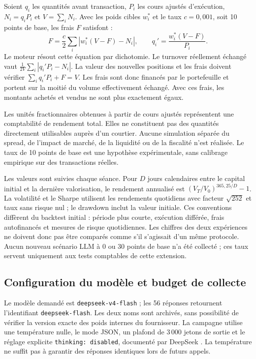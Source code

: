 Soient $q_i$ les quantités avant transaction, $P_i$ les cours ajustés d'exécution, $N_i=q_iP_i$ et $V=\sum_i N_i$. Avec les poids cibles $w_i^*$ et le taux $c=0{,}001$, soit 10 points de base, les frais $F$ satisfont :
\begin{equation}
F=\frac{c}{2}\sum_i\left|w_i^*(V-F)-N_i\right|,
\qquad q_i'=\frac{w_i^*(V-F)}{P_i}.
\label{eq:frais-allocation}
\end{equation}
Le moteur résout cette équation par dichotomie. Le turnover réellement échangé vaut $\frac{1}{2V}\sum_i|q_i'P_i-N_i|$. La valeur des nouvelles positions et les frais doivent vérifier $\sum_i q_i'P_i+F=V$. Les frais sont donc financés par le portefeuille et portent sur la moitié du volume effectivement échangé. Avec ces frais, les montants achetés et vendus ne sont plus exactement égaux.

Les unités fractionnaires obtenues à partir de cours ajustés représentent une comptabilité de rendement total. Elles ne constituent pas des quantités directement utilisables auprès d'un courtier. Aucune simulation séparée du spread, de l'impact de marché, de la liquidité ou de la fiscalité n'est réalisée. Le taux de 10 points de base est une hypothèse expérimentale, sans calibrage empirique sur des transactions réelles.

Les valeurs sont suivies chaque séance. Pour $D$ jours calendaires entre le capital initial et la dernière valorisation, le rendement annualisé est $(V_T/V_0)^{365{,}25/D}-1$. La volatilité et le Sharpe utilisent les rendements quotidiens avec facteur $\sqrt{252}$ et taux sans risque nul ; le drawdown inclut la valeur initiale. Ces conventions diffèrent du backtest initial : période plus courte, exécution différée, frais autofinancés et mesures de risque quotidiennes. Les chiffres des deux expériences ne doivent donc pas être comparés comme s'il s'agissait d'un même protocole. Aucun nouveau scénario LLM à 0 ou 30 points de base n'a été collecté ; ces taux servent uniquement aux tests comptables de cette extension.

\subsection{Configuration du modèle et budget de collecte}

Le modèle demandé est \texttt{deepseek-v4-flash} ; les 56 réponses retournent l'identifiant \texttt{deepseek-flash}. Les deux noms sont archivés, sans possibilité de vérifier la version exacte des poids internes du fournisseur. La campagne utilise une température nulle, le mode JSON, un plafond de 3\,000 jetons de sortie et le réglage explicite \texttt{thinking: disabled}, documenté par DeepSeek \citep{deepseekThinking2026}. La température ne suffit pas à garantir des réponses identiques lors de futurs appels.


